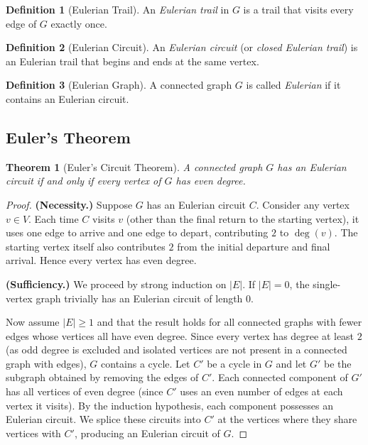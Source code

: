 \documentclass[12pt,a4paper]{article}
\theoremstyle{definition}
\newtheorem{definition}{Definition}[section]
\theoremstyle{plain}
\newtheorem{theorem}{Theorem}[section]
\theoremstyle{remark}
\begin{document}
\begin{definition}[Eulerian Trail]\label{def:euler-trail}
An \emph{Eulerian trail} in $G$ is a trail that visits every edge of $G$ exactly once.
\end{definition}

\begin{definition}[Eulerian Circuit]\label{def:euler-circuit}
An \emph{Eulerian circuit} (or \emph{closed Eulerian trail}) is an Eulerian trail that
begins and ends at the same vertex.
\end{definition}

\begin{definition}[Eulerian Graph]\label{def:euler-graph}
A connected graph $G$ is called \emph{Eulerian} if it contains an Eulerian circuit.
\end{definition}

\subsection{Euler's Theorem}

\begin{theorem}[Euler's Circuit Theorem]\label{thm:euler-circuit}
A connected graph $G$ has an Eulerian circuit if and only if every vertex of $G$ has
even degree.
\end{theorem}

\begin{proof}
\textbf{(Necessity.)} Suppose $G$ has an Eulerian circuit $C$. Consider any vertex
$v \in V$. Each time $C$ visits $v$ (other than the final return to the starting vertex),
it uses one edge to arrive and one edge to depart, contributing $2$ to $\deg(v)$. The
starting vertex itself also contributes $2$ from the initial departure and final arrival.
Hence every vertex has even degree.

\textbf{(Sufficiency.)} We proceed by strong induction on $|E|$. If $|E| = 0$, the
single-vertex graph trivially has an Eulerian circuit of length $0$.

Now assume $|E| \geq 1$ and that the result holds for all connected graphs with fewer
edges whose vertices all have even degree. Since every vertex has degree at least $2$
(as odd degree is excluded and isolated vertices are not present in a connected graph
with edges), $G$ contains a cycle. Let $C'$ be a cycle in $G$ and let $G'$ be the
subgraph obtained by removing the edges of $C'$. Each connected component of $G'$ has
all vertices of even degree (since $C'$ uses an even number of edges at each vertex it
visits). By the induction hypothesis, each component possesses an Eulerian circuit. We
splice these circuits into $C'$ at the vertices where they share vertices with $C'$,
producing an Eulerian circuit of $G$.
\end{proof}
\end{document}
